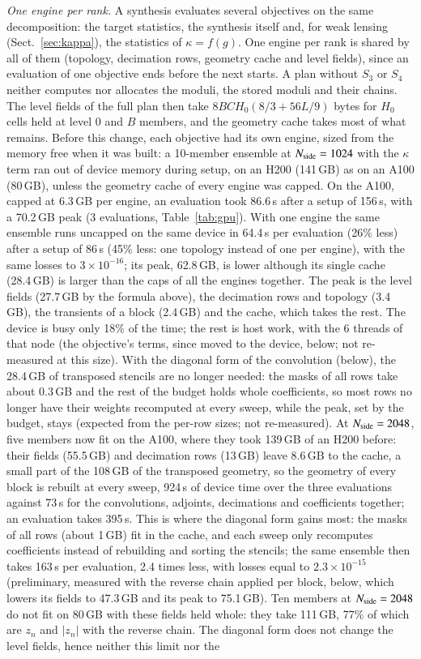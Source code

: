 \documentclass{aa}
\newcommand{\nside}{N_{\rm side}}
\begin{document}
\emph{One engine per rank.} A synthesis evaluates several objectives on the same decomposition: the target statistics, the synthesis itself and, for weak lensing (Sect.~\ref{sec:kappa}), the statistics of $\kappa=f(g)$. One engine per rank is shared by all of them (topology, decimation rows, geometry cache and level fields), since an evaluation of one objective ends before the next starts. A plan without $S_3$ or $S_4$ neither computes nor allocates the moduli, the stored moduli and their chains. The level fields of the full plan then take $8BCH_0(8/3 + 56L/9)$ bytes for $H_0$ cells held at level 0 and $B$ members, and the geometry cache takes most of what remains. Before this change, each objective had its own engine, sized from the memory free when it was built: a 10-member ensemble at $\nside=1024$ with the $\kappa$ term ran out of device memory during setup, on an H200 (141\,GB) as on an A100 (80\,GB), unless the geometry cache of every engine was capped. On the A100, capped at 6.3\,GB per engine, an evaluation took 86.6\,s after a setup of 156\,s, with a 70.2\,GB peak (3 evaluations, Table~\ref{tab:gpu}). With one engine the same ensemble runs uncapped on the same device in 64.4\,s per evaluation (26\% less) after a setup of 86\,s (45\% less: one topology instead of one per engine), with the same losses to $3\times10^{-16}$; its peak, 62.8\,GB, is lower although its single cache (28.4\,GB) is larger than the caps of all the engines together. The peak is the level fields (27.7\,GB by the formula above), the decimation rows and topology (3.4\,GB), the transients of a block (2.4\,GB) and the cache, which takes the rest. The device is busy only 18\% of the time; the rest is host work, with the 6 threads of that node (the objective's terms, since moved to the device, below; not re-measured at this size). With the diagonal form of the convolution (below), the 28.4\,GB of transposed stencils are no longer needed: the masks of all rows take about 0.3\,GB and the rest of the budget holds whole coefficients, so most rows no longer have their weights recomputed at every sweep, while the peak, set by the budget, stays (expected from the per-row sizes; not re-measured). At $\nside=2048$, five members now fit on the A100, where they took 139\,GB of an H200 before: their fields (55.5\,GB) and decimation rows (13\,GB) leave 8.6\,GB to the cache, a small part of the 108\,GB of the transposed geometry, so the geometry of every block is rebuilt at every sweep, 924\,s of device time over the three evaluations against 73\,s for the convolutions, adjoints, decimations and coefficients together; an evaluation takes 395\,s. This is where the diagonal form gains most: the masks of all rows (about 1\,GB) fit in the cache, and each sweep only recomputes coefficients instead of rebuilding and sorting the stencils; the same ensemble then takes 163\,s per evaluation, 2.4 times less, with losses equal to $2.3\times10^{-15}$ (preliminary, measured with the reverse chain applied per block, below, which lowers its fields to 47.3\,GB and its peak to 75.1\,GB). Ten members at $\nside=2048$ do not fit on 80\,GB with these fields held whole: they take 111\,GB, 77\% of which are $z_n$ and $|z_n|$ with the reverse chain. The diagonal form does not change the level fields, hence neither this limit nor the 
\end{document}
